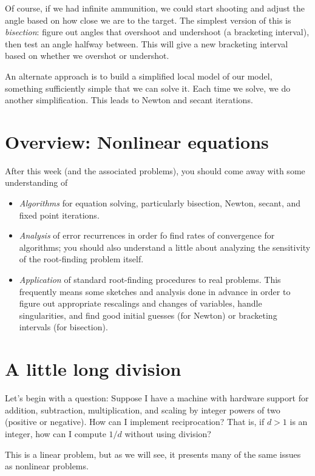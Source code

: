 \documentclass[12pt, leqno]{article}
\begin{document}
Of course, if we had infinite ammunition, we could start shooting and
adjust the angle based on how close we are to the target.  The
simplest version of this is {\em bisection}: figure out angles that
overshoot and undershoot (a bracketing interval), then test an angle
halfway between.  This will give a new bracketing interval based on
whether we overshot or undershot.

An alternate approach is to build a simplified local model of our
model, something sufficiently simple that we can solve it.  Each time
we solve, we do another simplification.  This leads to Newton and
secant iterations.

\section*{Overview: Nonlinear equations}

After this week (and the associated problems), you should come away
with some understanding of
\begin{itemize}
\item {\em Algorithms} for equation solving, particularly bisection,
  Newton, secant, and fixed point iterations.
\item {\em Analysis} of error recurrences in order fo find rates of
  convergence for algorithms; you should also understand a little
  about analyzing the sensitivity of the root-finding problem itself.
\item {\em Application} of standard root-finding procedures to real
  problems.  This frequently means some sketches and analysis done in
  advance in order to figure out appropriate rescalings and changes of
  variables, handle singularities, and find good initial guesses (for
  Newton) or bracketing intervals (for bisection).
\end{itemize}

\section*{A little long division}

Let's begin with a question: Suppose I have a machine with hardware
support for addition, subtraction, multiplication, and scaling by
integer powers of two (positive or negative).  How can I implement
reciprocation?  That is, if $d > 1$ is an integer, how can I compute
$1/d$ without using division?

This is a linear problem, but as we will see, it presents many of
the same issues as nonlinear problems.
\end{document}
